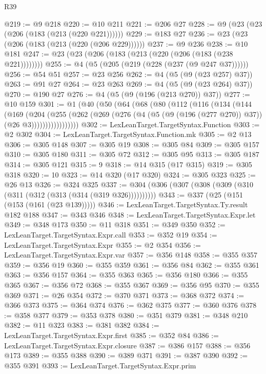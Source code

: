 \begin{lexlean}{R39}
\begin{coremodule}
@219 := @9 @218
@220 := @10 @211
@221 := @206 @27
@228 := @9 (@23 (@23 (@206 (@183 (@213 (@220 @221))))))
@229 := @183 @27
@236 := @23 (@23 (@206 (@183 (@213 (@220 (@206 @229))))))
@237 := @9 @236
@238 := @10 @181
@247 := @23 (@23 (@206 (@183 (@213 (@220 (@206 (@183 (@238 @221))))))))
@255 := @4 (@5 (@205 (@219 (@228 (@237 (@9 @247 @37))))))
@256 := @54 @51
@257 := @23 @256
@262 := @4 (@5 (@9 (@23 @257) @37))
@263 := @91 @27
@264 := @23 @263
@269 := @4 (@5 (@9 (@23 @264) @37))
@270 := @190 @27
@276 := @4 (@5 (@9 (@196 (@213 @270)) @37))
@277 := @10 @159
@301 := @1
    (@40
      (@50
        (@64
          (@68
            (@80
              (@112
                (@116
                  (@134
                    (@144
                      (@169
                        (@204
                          (@255
                            (@262
                              (@269
                                (@276 (@4 (@5 (@9 (@196 (@277 @270)) @37)) (@26 @3)))))))))))))))))
@302 := LexLeanTarget.TargetSyntax.Function
@303 := @2 @302
@304 := LexLeanTarget.TargetSyntax.Function.mk
@305 := @2 @13
@306 := @305 @148
@307 := @305 @19
@308 := @305 @84
@309 := @305 @157
@310 := @305 @180
@311 := @305 @72
@312 := @305 @95
@313 := @305 @187
@314 := @305 @121
@315 := 9
@318 := @14 @315 (@17 @315)
@319 := @305 @318
@320 := 10
@323 := @14 @320 (@17 @320)
@324 := @305 @323
@325 := @26 @13
@326 := @324 @325
@337 := @304 (@306 (@307 (@308 (@309 (@310 (@311 (@312 (@313 (@314 (@319 @326))))))))))
@343 := @337 (@25 (@151 (@153 (@161 (@23 @139)))))
@346 := LexLeanTarget.TargetSyntax.Ty.result @182 @188
@347 := @343 @346
@348 := LexLeanTarget.TargetSyntax.Expr.let
@349 := @348 @173
@350 := @11 @318
@351 := @349 @350
@352 := LexLeanTarget.TargetSyntax.Expr.call
@353 := @352 @19
@354 := LexLeanTarget.TargetSyntax.Expr
@355 := @2 @354
@356 := LexLeanTarget.TargetSyntax.Expr.var
@357 := @356 @148
@358 := @355 @357
@359 := @356 @19
@360 := @355 @359
@361 := @356 @84
@362 := @355 @361
@363 := @356 @157
@364 := @355 @363
@365 := @356 @180
@366 := @355 @365
@367 := @356 @72
@368 := @355 @367
@369 := @356 @95
@370 := @355 @369
@371 := @26 @354
@372 := @370 @371
@373 := @368 @372
@374 := @366 @373
@375 := @364 @374
@376 := @362 @375
@377 := @360 @376
@378 := @358 @377
@379 := @353 @378
@380 := @351 @379
@381 := @348 @210
@382 := @11 @323
@383 := @381 @382
@384 := LexLeanTarget.TargetSyntax.Expr.first
@385 := @352 @84
@386 := LexLeanTarget.TargetSyntax.Expr.closure
@387 := @386 @157
@388 := @356 @173
@389 := @355 @388
@390 := @389 @371
@391 := @387 @390
@392 := @355 @391
@393 := LexLeanTarget.TargetSyntax.Expr.prim

\end{coremodule}
\end{lexlean}
